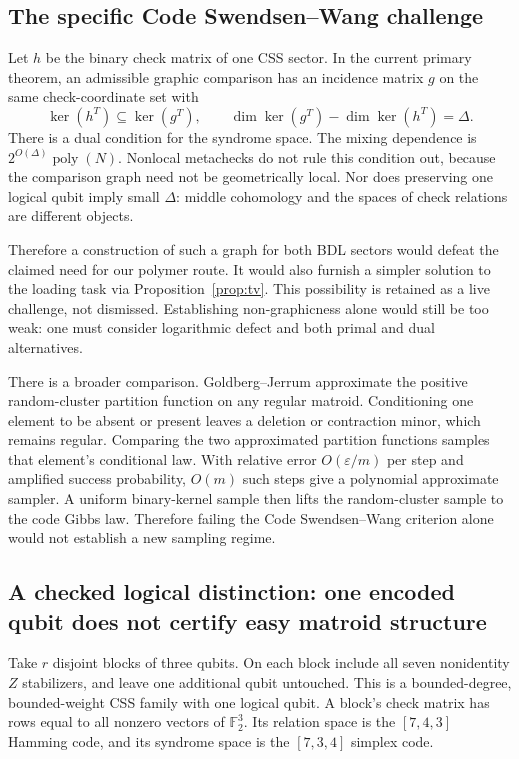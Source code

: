 \documentclass[11pt,a4paper]{article}
\newcommand{\poly}{\operatorname{poly}}
\newcommand{\F}{\mathbb F_2}
\begin{document}
\subsection{The specific Code Swendsen--Wang challenge}

Let $h$ be the binary check matrix of one CSS sector. In the current primary theorem, an admissible graphic comparison has an incidence matrix $g$ on the same check-coordinate set with
\begin{equation}
 \ker(h^T)\subseteq\ker(g^T),\qquad
 \dim\ker(g^T)-\dim\ker(h^T)=\Delta.
\end{equation}
There is a dual condition for the syndrome space. The mixing dependence is $2^{O(\Delta)}\poly(N)$. Nonlocal metachecks do not rule this condition out, because the comparison graph need not be geometrically local. Nor does preserving one logical qubit imply small $\Delta$: middle cohomology and the spaces of check relations are different objects.\cite{csw}

Therefore a construction of such a graph for both BDL sectors would defeat the claimed need for our polymer route. It would also furnish a simpler solution to the loading task via Proposition~\ref{prop:tv}. This possibility is retained as a live challenge, not dismissed. Establishing non-graphicness alone would still be too weak: one must consider logarithmic defect and both primal and dual alternatives.

There is a broader comparison. Goldberg--Jerrum approximate the positive random-cluster partition function on any regular matroid.\cite{gj} Conditioning one element to be absent or present leaves a deletion or contraction minor, which remains regular. Comparing the two approximated partition functions samples that element's conditional law. With relative error $O(\varepsilon/m)$ per step and amplified success probability, $O(m)$ such steps give a polynomial approximate sampler. A uniform binary-kernel sample then lifts the random-cluster sample to the code Gibbs law. Therefore failing the Code Swendsen--Wang criterion alone would not establish a new sampling regime.

\subsection{A checked logical distinction: one encoded qubit does not certify easy matroid structure}

Take $r$ disjoint blocks of three qubits. On each block include all seven nonidentity $Z$ stabilizers, and leave one additional qubit untouched. This is a bounded-degree, bounded-weight CSS family with one logical qubit. A block's check matrix has rows equal to all nonzero vectors of $\F^3$. Its relation space is the $[7,4,3]$ Hamming code, and its syndrome space is the $[7,3,4]$ simplex code.
\end{document}
